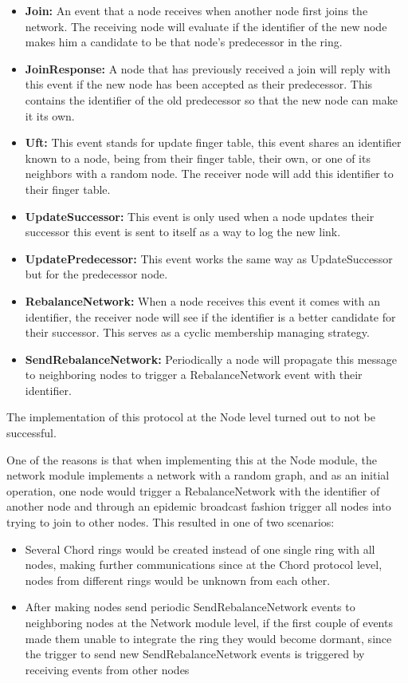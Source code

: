 \begin{itemize}
  \item \textbf{Join: } An event that a node receives when another node first joins
the network. The receiving node will evaluate if the identifier of the new node makes him
a candidate to be that node's predecessor in the ring.
  \item \textbf{JoinResponse: } A node that has previously received a join will reply
with this event if the new node has been accepted as their predecessor. This contains
the identifier of the old predecessor so that the new node can make it its own.
  \item \textbf{Uft: } This event stands for update finger table, this event shares
an identifier known to a node, being from their finger table, their own, or one of
its neighbors with a random node. The receiver node will add this identifier to their finger table.
  \item \textbf{UpdateSuccessor: } This event is only used when a node updates their successor
this event is sent to itself as a way to log the new link.
  \item \textbf{UpdatePredecessor: } This event works the same way as UpdateSuccessor
but for the predecessor node.
  \item \textbf{RebalanceNetwork: } When a node receives this event it comes with
an identifier, the receiver node will see if the identifier is a better candidate for
their successor. This serves as a cyclic membership managing strategy.
  \item \textbf{SendRebalanceNetwork: } Periodically a node will propagate this message
to neighboring nodes to trigger a RebalanceNetwork event with their identifier.
\end{itemize}

The implementation of this protocol at the Node level turned out to not be successful.

One of the reasons is that when implementing this at the Node module, the network
module implements a network with a random graph, and as an initial operation, one
node would trigger a RebalanceNetwork with the identifier of another node and through
an epidemic broadcast fashion trigger all nodes into trying to join to other nodes.
This resulted in one of two scenarios:

\begin{itemize}
  \item Several Chord rings would be created instead of one single ring with all nodes,
making further communications since at the Chord protocol level, nodes from different rings
would be unknown from each other.
  \item After making nodes send periodic SendRebalanceNetwork events to neighboring
nodes at the Network module level, if the first couple of events made them unable to
integrate the ring they would become dormant, since the trigger to send  new
SendRebalanceNetwork events is triggered  by receiving events from other nodes
\end{itemize}

